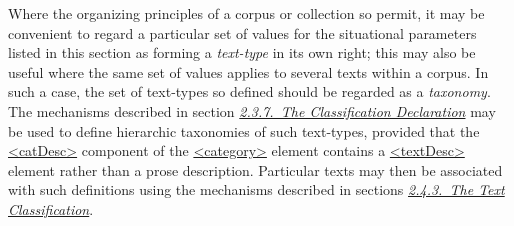 Where the organizing principles of a corpus or collection so permit, it may be convenient to regard a particular set of values for the situational parameters listed in this section as forming a \textit{text-type} in its own right; this may also be useful where the same set of values applies to several texts within a corpus. In such a case, the set of text-types so defined should be regarded as a \textit{taxonomy}. The mechanisms described in section \textit{\hyperref[HD55]{2.3.7.\ The Classification Declaration}} may be used to define hierarchic taxonomies of such text-types, provided that the \hyperref[TEI.catDesc]{<catDesc>} component of the \hyperref[TEI.category]{<category>} element contains a \hyperref[TEI.textDesc]{<textDesc>} element rather than a prose description. Particular texts may then be associated with such definitions using the mechanisms described in sections \textit{\hyperref[HD43]{2.4.3.\ The Text Classification}}.\par
